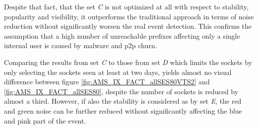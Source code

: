 Despite that fact, that the set \emph{C} is not optimized at all with respect to stability, popularity and visibility, it outperforms the traditional approach in terms of noise reduction without significantly worsen the real event detection. 
This confirms the assumption that a high number of unreachable prefixes affecting only a single internal user is caused by malware and \gls{p2p} churn.

Comparing the results from set \emph{C} to those from set \emph{D} which limits the sockets by only selecting the sockets seen at least at two days, yields almost no visual difference between figure \ref{fig:AMS_IX_FACT_allSES80VTS2} and \ref{fig:AMS_IX_FACT_allSES80}, despite the number of sockets is reduced by almost a third. 
However, if also the stability is considered as by set \emph{E}, the red and green noise can be further reduced without significantly affecting the blue and pink part of the event.

